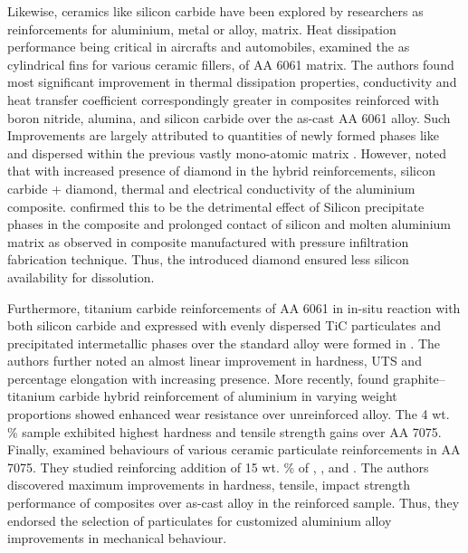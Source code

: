 \documentclass{article}
\begin{document}
\begin{multicols}{2}
                Likewise, ceramics like silicon carbide have been explored by researchers as reinforcements for aluminium, metal or alloy, matrix. Heat dissipation performance being critical in aircrafts and automobiles, \cite{Manivannan2017Thermal} examined the as cylindrical fins for various ceramic fillers, of AA 6061 matrix. The authors found most significant improvement in thermal dissipation properties, conductivity and heat transfer coefficient correspondingly greater in composites reinforced with boron nitride, alumina, and silicon carbide over the as-cast AA 6061 alloy. Such Improvements are largely attributed to quantities of newly formed phases like  and  dispersed within the previous vastly mono-atomic matrix \citep{Mandal2013Effect}. However, \cite{Carron2008Thermal} noted that with increased presence of diamond in the hybrid reinforcements, silicon carbide + diamond, thermal and electrical conductivity of the aluminium composite. confirmed this to be the detrimental effect of Silicon precipitate phases in the composite and prolonged contact of silicon and molten aluminium matrix as observed in composite manufactured with pressure infiltration fabrication technique. Thus, the introduced diamond ensured less silicon availability for dissolution.

                Furthermore, titanium carbide reinforcements of AA 6061 in in-situ reaction with both silicon carbide and  expressed with evenly dispersed TiC particulates and precipitated intermetallic phases over the standard alloy were formed in \citep{LIJAY2016Microstructure}. The authors further noted an almost linear improvement in hardness, UTS and percentage elongation with increasing  presence. More recently, \cite{Kumar2018Experimental} found graphite–titanium carbide hybrid reinforcement of aluminium in varying weight proportions showed enhanced wear resistance over unreinforced alloy. The 4 wt. \%  sample exhibited highest hardness and tensile strength gains over AA 7075. Finally, \cite{Bandhu2018Characterization}examined behaviours of various ceramic particulate reinforcements in AA 7075. They studied reinforcing addition of 15 wt. \% of , ,  and . The authors discovered maximum improvements in hardness, tensile, impact strength performance of composites over as-cast alloy in the  reinforced sample. Thus, they endorsed the selection of  particulates for customized aluminium alloy improvements in mechanical behaviour.


\end{multicols}
\end{document}
